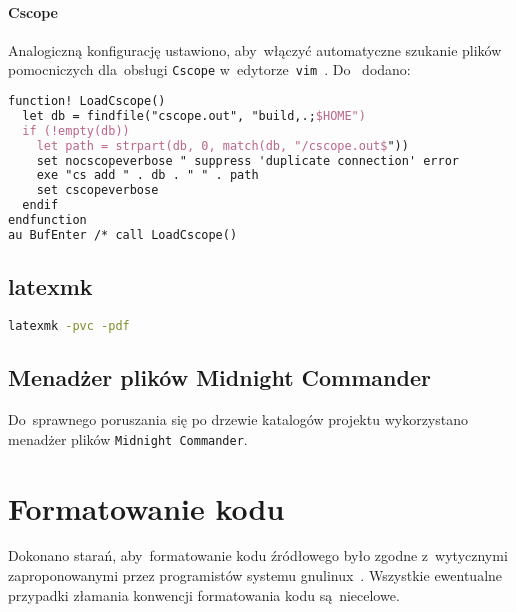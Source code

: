 \documentclass[thesis]{subfiles}
\begin{document}
\paragraph{Cscope}

Analogiczną konfigurację ustawiono, aby~włączyć automatyczne szukanie plików pomocniczych dla~obsługi \texttt{Cscope} w~edytorze~\texttt{vim}~\cite{cscope,cscope-autoload}. Do~ dodano:
\begin{lstlisting}[language=tex,numbers=none,caption={Konfiguracja \texttt{Cscope} w~\texttt{.vimrc}}]
function! LoadCscope()
  let db = findfile("cscope.out", "build,.;$HOME")
  if (!empty(db))
    let path = strpart(db, 0, match(db, "/cscope.out$"))
    set nocscopeverbose " suppress 'duplicate connection' error
    exe "cs add " . db . " " . path
    set cscopeverbose
  endif
endfunction
au BufEnter /* call LoadCscope()
\end{lstlisting}


\subsection{latexmk}

\begin{lstlisting}[language=bash,numbers=none,caption={Uruchomienie ciągłej kompilacji \LaTeX do~PDF}]
latexmk -pvc -pdf
\end{lstlisting}


\subsection{Menadżer plików Midnight Commander}

Do~sprawnego poruszania się po drzewie katalogów projektu wykorzystano menadżer plików \texttt{Midnight~Commander}.


\section{Formatowanie kodu}

Dokonano starań, aby~formatowanie kodu źródłowego było zgodne z~wytycznymi zaproponowanymi przez programistów  systemu \gls{gnulinux}~\cite{kernel-coding-style}. Wszystkie ewentualne przypadki złamania konwencji formatowania kodu są~niecelowe.
\end{document}
